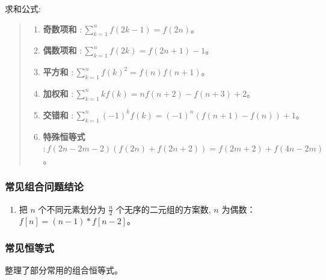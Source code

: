 \documentclass[a4paper,12pt]{article}
\begin{document}
\noindent 求和公式:

\begin{quote}
\begin{enumerate}
    \item  \textbf{奇数项和} \(\colon \sum_{k=1}^n f(2k-1) = f(2n)\)。 \\
    \item  \textbf{偶数项和} \(\colon \sum_{k=1}^n f(2k) = f(2n+1) - 1\)。 \\
    \item  \textbf{平方和} \(\colon \sum_{k=1}^n f(k)^2 = f(n) f(n+1)\)。 \\
    \item  \textbf{加权和} \(\colon \sum_{k=1}^n k f(k) = n f(n+2) - f(n+3) + 2\)。 \\
    \item  \textbf{交错和} \(\colon \sum_{k=1}^n (-1)^k f(k) = (-1)^n (f(n+1) - f(n)) + 1\)。 \\
    \item  \textbf{特殊恒等式} \(\colon f(2n-2m-2) (f(2n) + f(2n+2)) = f(2m+2) + f(4n-2m)\)。
\end{enumerate}
\end{quote}

\subsubsection{常见组合问题结论}

\begin{enumerate}
    \item 把 \(n\) 个不同元素划分为 \(\frac{n}{2}\) 个无序的二元组的方案数, \(n\) 为偶数：
    \(
        f[n] = (n - 1) * f[n - 2]
    \)。
\end{enumerate}

\subsubsection{常见恒等式}

\noindent 整理了部分常用的组合恒等式。
\end{document}
